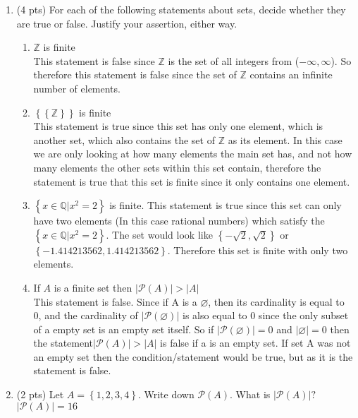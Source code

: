 \documentclass[12pt]{article}
\newcommand{\abs}[1]{\left| #1 \right|}
\newcommand{\set}[1]{\left\{ #1 \right\}}
\newcommand{\p}{\ensuremath{\mathcal{P}}}
\newcommand{\qq}{\ensuremath{\mathbb{Q}}}
\newcommand{\zz}{\ensuremath{\mathbb{Z}}}
\let\emptyset\varnothing
\begin{document}
\begin{enumerate}
\item (4 pts) For each of the following statements about sets, decide whether they are true or false. Justify your assertion, either way.
\begin{enumerate}
	\item $\zz$ is finite
    \\This statement is false since $\zz$  is the set of all integers from ($-\infty,\infty$). So therefore this statement is false since the set of $\zz$ contains an infinite number of elements.\\
	\item $\set{\set{\zz}}$ is finite
    \\This statement is true since this set has only one element, which is another set, which also contains the set of $\zz$ as its element. In this case we are only looking at how many elements the main set has, and not how many elements the other sets within this set contain, therefore the statement is true that this set is finite since it only contains one element.\\
	\item $\set{x\in\qq\vert x^2=2}$ is finite.
    This statement is true since this set can only have two elements (In this case rational numbers) which satisfy the $\set{x\in\qq\vert x^2=2}$. The set would look like $\set{-\sqrt2,\sqrt2}$ or $\set{-1.414213562,1.414213562}$. Therefore this set is finite with only two elements.\\
	\item If $A$ is a finite set then $\abs{\p(A)}>\abs{A}$
\\This statement is false. Since if A is a $\emptyset$, then its cardinality is equal to 0, and the cardinality of $\abs{\mathcal{P}(\emptyset)}$ is also equal to 0 since the only subset of a empty set is an empty set itself. So if $\abs{\mathcal{P}(\emptyset)} = 0$ and $\abs{\emptyset} = 0$ then the statement$\abs{\p(A)}>\abs{A}$ is false if a is an empty set. If set A was not an empty set then the condition/statement would be true, but as it is the statement is false.
\end{enumerate}

\item (2 pts) Let $A=\set{1,2,3,4}$. Write down $\p(A)$. What is $\abs{\p(A)}?$
    \\$\abs{\p(A)} = 16$



\end{enumerate}
\end{document}
